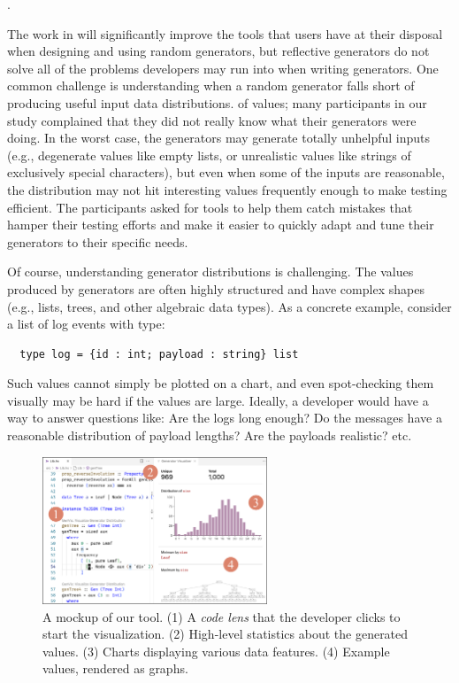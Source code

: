 
.

The work in  will significantly improve the tools that users
have at their disposal when designing and using random generators, but
reflective generators do not solve all of the problems developers may run into
when writing generators. One common challenge is understanding when a random
generator falls short of producing useful input data distributions.  of values;
many participants in our study complained that they did not really know what
their generators were doing. In the worst case, the generators may generate
totally unhelpful inputs (e.g., degenerate values like empty lists, or
unrealistic values like strings of exclusively special characters), but even
when some of the inputs are reasonable, the distribution may not hit interesting
values frequently enough to make testing efficient.  The participants asked for
tools to help them catch mistakes that hamper their testing efforts and make it
easier to quickly adapt and tune their generators to their specific needs.

Of course, understanding generator distributions is challenging.  The values
produced by generators are often highly structured and have complex shapes
(e.g., lists, trees, and other algebraic data types). As a
concrete example,
\iflater
{}
\fi
consider a list of log events with type:
\begin{lstlisting}
  type log = {id : int; payload : string} list
\end{lstlisting}
Such values cannot simply be plotted on a chart, and even spot-checking them
visually may be hard if the values are large.
Ideally, a developer would have a way to answer questions like: Are the logs
long enough? Do the messages have a reasonable distribution of payload lengths?
Are the payloads realistic? etc.

\begin{figure}
  \centering
  \includegraphics[width=0.6\textwidth]{assets/gen-vis.pdf}
  \caption{A mockup of our tool. (1) A {\em code lens} that the developer clicks
  to start the visualization. (2) High-level statistics about the generated values. (3)
  Charts displaying various data features. (4) Example values, rendered as
  graphs.}\label{fig:gen-vis}
\end{figure}

